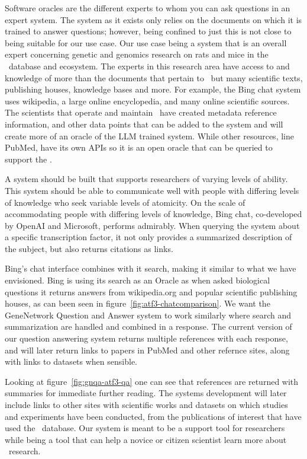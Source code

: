 Software oracles are the different experts to whom you can ask questions in an expert system.
The system as it exists only relies on the documents on which it is trained to answer questions; however, being confined to just this is not close to being suitable for our use case.
Our use case being a system that is an overall expert concerning genetic and genomics research on rats and mice in the \GN\ database and ecosystem.
The experts in this research area have access to and knowledge of more than the documents that pertain to \GN\ but many scientific texts, publishing houses, knowledge bases and more.
For example, the Bing chat system uses wikipedia, a large online encyclopedia, and many online scientific sources.
The scientists that operate and maintain \GN\ have created metadata reference information, and other data points that can be added to the system and will create more of an oracle of the LLM trained system.
While other resources, line PubMed, have its own APIs so it is an open oracle that can be queried to support the \project.

A system should be built that supports researchers of varying levels of ability.
This system should be able to communicate well with people with differing levels of knowledge who seek variable levels of atomicity.
On the scale of accommodating people with differing levels of knowledge, Bing chat, co-developed by OpenAI and Microsoft, performs admirably.
When querying the system about a specific transcription factor, it not only provides a summarized description of the subject, but also returns citations as links.



Bing's chat interface combines with it search, making it similar to what we have envisioned. 
Bing is using its search as an Oracle as when asked biological questions it returns answers from wikipedia.org and popular scientific publishing houses, as can been seen in figure~\ref{fig:atf3-chatcomparison}.
We want the GeneNetwork Question and Answer system to work similarly where search and summarization are handled and combined in a response.
The current version of our question answering system returns multiple references with each response, and will later return links to papers in PubMed and other refernce sites, along with links to datasets when sensible.



Looking at figure~\ref{fig:gnqa-atf3-qa} one can see that references are returned with summaries for immediate further reading.
The systems development will later include links to other sites with scientific works and datasets on which studies and experiments have been conducted, from the publications of interest that have used the \GN\ database.
Our system is meant to be a support tool for researchers while being a tool that can help a novice or citizen scientist learn more about \GN\ research.
